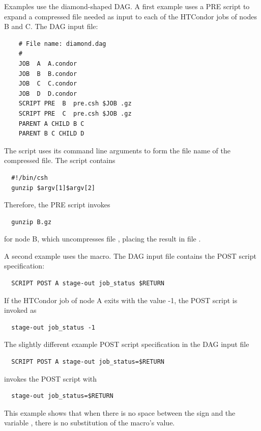 \begin{itemize}
\begin{itemize}
\end{itemize}



Examples use the diamond-shaped DAG.
A first example uses a PRE script to expand a compressed file 
needed as input to each of the HTCondor jobs of nodes B and C.
The DAG input file:

\footnotesize
\begin{verbatim}
    # File name: diamond.dag
    #
    JOB  A  A.condor 
    JOB  B  B.condor 
    JOB  C  C.condor	
    JOB  D  D.condor
    SCRIPT PRE  B  pre.csh $JOB .gz
    SCRIPT PRE  C  pre.csh $JOB .gz
    PARENT A CHILD B C
    PARENT B C CHILD D
\end{verbatim}
\normalsize

The script  uses its command line arguments to form the file name
of the compressed file.
The script contains

\begin{verbatim}
  #!/bin/csh
  gunzip $argv[1]$argv[2]
\end{verbatim}

Therefore, the PRE script invokes  
\begin{verbatim}
  gunzip B.gz
\end{verbatim}
for node B, which uncompresses file ,
placing the result in file .

A second example uses the  macro.
The DAG input file contains the POST script specification:
\begin{verbatim}
  SCRIPT POST A stage-out job_status $RETURN 
\end{verbatim}
If the HTCondor job of node A exits with the value -1,
the POST script is invoked as
\begin{verbatim}
  stage-out job_status -1
\end{verbatim}

The slightly different example POST script specification
in the DAG input file
\begin{verbatim}
  SCRIPT POST A stage-out job_status=$RETURN 
\end{verbatim}
invokes the POST script with
\begin{verbatim}
  stage-out job_status=$RETURN
\end{verbatim}

This example shows that when
there is no space between the \Expr{=} sign and the variable ,
there is no substitution of the macro's value.


\end{itemize}
